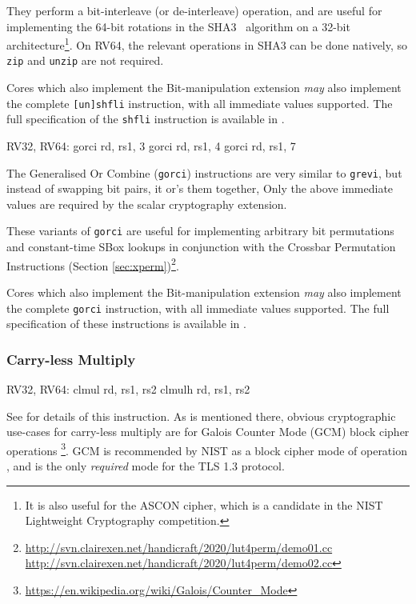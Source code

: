 They perform a bit-interleave (or de-interleave) operation, and are
useful for implementing the 64-bit rotations in the
SHA3~\cite{nist:fips:202} algorithm on
a 32-bit architecture\footnote{
It is also useful for the ASCON cipher, which is a candidate in the
NIST Lightweight Cryptography competition.
}.
On RV64, the relevant operations in SHA3 can be done natively, so
{\tt zip} and {\tt unzip} are not required.

Cores which also implement the Bit-manipulation extension {\em may} also
implement the complete {\tt [un]shfli} instruction, with all immediate values
supported.
The full specification of the {\tt shfli} instruction is available in
\cite[Section 2.2.3]{riscv:bitmanip:draft}.

\begin{cryptobitmanipisa}
RV32, RV64:             
    gorci   rd, rs1, 3
    gorci   rd, rs1, 4
    gorci   rd, rs1, 7
\end{cryptobitmanipisa}

The Generalised Or Combine ({\tt gorci}) instructions are very similar
to {\tt grevi}, but instead of swapping bit pairs, it or's them together,
Only the above immediate values are required by the scalar cryptography
extension.

These variants of {\tt gorci} are
useful for implementing arbitrary bit permutations and
constant-time SBox lookups in
conjunction with the Crossbar Permutation Instructions
(Section \ref{sec:xperm})\footnote{
\url{http://svn.clairexen.net/handicraft/2020/lut4perm/demo01.cc}
\url{http://svn.clairexen.net/handicraft/2020/lut4perm/demo02.cc}
}.

Cores which also implement the Bit-manipulation extension {\em may} also
implement the complete {\tt gorci} instruction, with all immediate values
supported.
The full specification of these instructions is available in
\cite[Section 2.3]{riscv:bitmanip:draft}.

\subsubsection{Carry-less Multiply}

\begin{cryptobitmanipisa}
RV32, RV64:
    clmul  rd, rs1, rs2
    clmulh rd, rs1, rs2
\end{cryptobitmanipisa}

See \cite[Section 2.6]{riscv:bitmanip:draft} for details of
this instruction.
As is mentioned there, obvious cryptographic use-cases for carry-less
multiply are for Galois Counter Mode (GCM) block cipher operations
\footnote{\url{https://en.wikipedia.org/wiki/Galois/Counter_Mode}}.
GCM is recommended by NIST as a block cipher mode of operation
\cite{nist:gcm}, and is the only {\em required} mode for the TLS 1.3
protocol.

